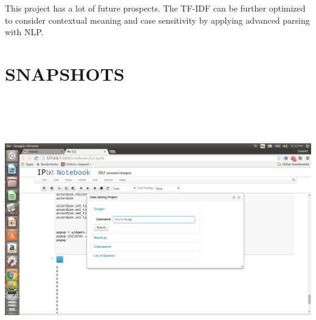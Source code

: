 \documentclass{mnnit}
\begin{document}
\noindent This project has a lot of future prospects. The TF-IDF can be further optimized to consider contextual meaning and case sensitivity
by applying advanced parsing with NLP.


\chapter{SNAPSHOTS}
\vspace{10 mm}
\includegraphics[width=175mm,height=115mm]{Screenshot1.jpg}

\vspace{2 mm}
\begin{center}
\cite{ipythoninfo1}
\cite{ipythoninfo2}
\end{center}

\vspace{120 mm}
\end{document}
